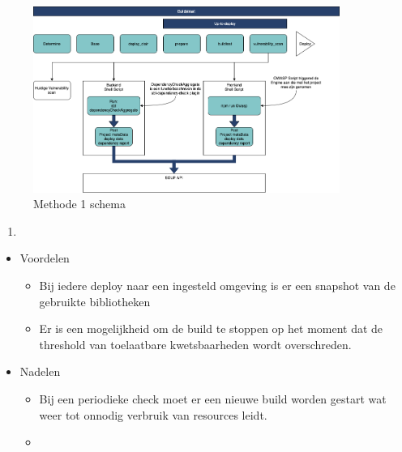 \begin{figure}[bth]
    \myfloatalign
    \includegraphics[width=10cm]{gfx/Methode_1}
    \caption{Methode 1 schema}
    \label{fig:methode1Schema}
\end{figure}

\begin{enumerate}
    \item
\end{enumerate}
\begin{itemize}
    \item Voordelen   \begin{itemize}
                          \item Bij iedere deploy naar een ingesteld omgeving is er een snapshot van de gebruikte bibliotheken
                          \item Er is een mogelijkheid om de build te stoppen op het moment dat de threshold van toelaatbare kwetsbaarheden wordt overschreden.
    \end{itemize}
    \item Nadelen  \begin{itemize}
                       \item Bij een periodieke check moet er een nieuwe build worden gestart wat weer tot onnodig verbruik van resources leidt.
                       \item
    \end{itemize}
\end{itemize}

